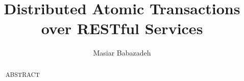 \documentclass[mscthesis,print]{usiinfthesis}
\title{Distributed Atomic Transactions over RESTful Services}
\author{Masiar Babazadeh} %
\begin{document}
\maketitle %

\frontmatter %
\begin{abstract}
ABSTRACT
\end{abstract}

\begin{acknowledgements}
\end{acknowledgements}

\tableofcontents 
\listoffigures %
\listoftables %

\mainmatter







%
%

\backmatter




\end{document}
